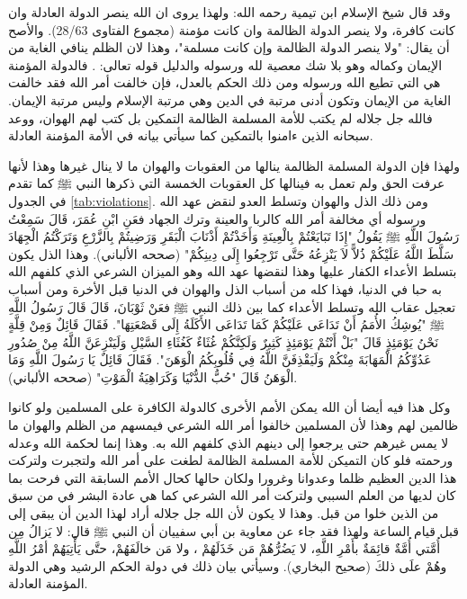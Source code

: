 وقد قال شيخ الإسلام ابن تيمية رحمه الله: ولهذا يروى ان الله ينصر الدولة العادلة وان كانت كافرة، ولا ينصر الدولة الظالمة وان كانت مؤمنة {\footnotesize (مجموع الفتاوى 28/63)}. والأصح أن يقال: "ولا ينصر الدولة الظالمة وإن كانت مسلمة"، وهذا لان الظلم ينافي الغاية من الإيمان وكماله وهو بلا شك معصية لله ورسوله والدليل قوله تعالى: \quranayah*[49][14]{\footnotesize \surahname*[49]}. فالدولة المؤمنة هي التي تطيع الله ورسوله ومن ذلك الحكم بالعدل، فإن خالفت أمر الله فقد خالفت الغاية من الإيمان وتكون أدنى مرتبة في الدين وهي مرتبة الإسلام وليس مرتبة الإيمان. فالله جل جلاله لم يكتب للأمة المسلمة الظالمة التمكين  بل كتب لهم الهوان، ووعد سبحانه الذين ءامنوا بالتمكين كما سيأتي بيانه في الأمة المؤمنة العادلة.

ولهذا فإن الدولة المسلمة الظالمة ينالها من العقوبات والهوان ما لا ينال غيرها وهذا لأنها عرفت الحق ولم تعمل به فينالها كل العقوبات الخمسة التي ذكرها النبي ﷺ كما تقدم في الجدول \ref{tab:violations}. ومن ذلك الذل والهوان وتسلط العدو لنقض عهد الله ورسوله أي مخالفة أمر الله كالربا والعينة وترك الجهاد فعَنِ ابْنِ عُمَرَ، قَالَ سَمِعْتُ رَسُولَ اللَّهِ ﷺ يَقُولُ "إِذَا تَبَايَعْتُمْ بِالْعِينَةِ وَأَخَذْتُمْ أَذْنَابَ الْبَقَرِ وَرَضِيتُمْ بِالزَّرْعِ وَتَرَكْتُمُ الْجِهَادَ سَلَّطَ اللَّهُ عَلَيْكُمْ ذُلاًّ لاَ يَنْزِعُهُ حَتَّى تَرْجِعُوا إِلَى دِينِكُمْ" {\footnotesize (صححه الألباني)}. وهذا الذل يكون بتسلط الأعداء الكفار عليها وهذا لنقضها عهد الله وهو الميزان الشرعي الذي كلفهم الله به حبا في الدنيا، فهذا كله من أسباب الذل والهوان في الدنيا قبل الأخرة ومن أسباب تعجيل عقاب الله وتسلط الأعداء  كما بين ذلك النبي ﷺ فعَنْ ثَوْبَانَ، قَالَ قَالَ رَسُولُ اللَّهِ ﷺ "يُوشِكُ الأُمَمُ أَنْ تَدَاعَى عَلَيْكُمْ كَمَا تَدَاعَى الأَكَلَةُ إِلَى قَصْعَتِهَا". فَقَالَ قَائِلٌ وَمِنْ قِلَّةٍ نَحْنُ يَوْمَئِذٍ قَالَ "بَلْ أَنْتُمْ يَوْمَئِذٍ كَثِيرٌ وَلَكِنَّكُمْ غُثَاءٌ كَغُثَاءِ السَّيْلِ وَلَيَنْزِعَنَّ اللَّهُ مِنْ صُدُورِ عَدُوِّكُمُ الْمَهَابَةَ مِنْكُمْ وَلَيَقْذِفَنَّ اللَّهُ فِي قُلُوبِكُمُ الْوَهَنَ". فَقَالَ قَائِلٌ يَا رَسُولَ اللَّهِ وَمَا الْوَهَنُ قَالَ "حُبُّ الدُّنْيَا وَكَرَاهِيَةُ الْمَوْتِ" {\footnotesize (صححه الألباني)}. 

وكل هذا فيه أيضا أن الله يمكن الأمم الأخرى كالدولة الكافرة على المسلمين ولو كانوا ظالمين لهم وهذا لأن المسلمين خالفوا أمر الله الشرعي فيمسهم من الظلم والهوان ما لا يمس غيرهم حتى يرجعوا إلى دينهم الذي كلفهم الله به. وهذا إنما لحكمة الله وعدله ورحمته فلو كان التميكن للأمة المسلمة الظالمة لطغت على أمر الله ولتجبرت ولتركت هذا الدين العظيم ظلما وعدوانا وغرورا ولكان حالها كحال الأمم السابقة التي فرحت بما كان لديها من العلم السببي  ولتركت أمر الله الشرعي كما هي عادة البشر في من سبق من الذين خلوا من قبل. وهذا لا يكون لأن الله جل جلاله أراد لهذا الدين أن يبقى إلى قبل قيام الساعة ولهذا فقد جاء عن معاوية بن أبي سفييان أن النبي ﷺ قال: لا يَزالُ مِن أُمَّتي أُمَّةٌ قائِمَةٌ بأَمْرِ اللَّهِ، لا يَضُرُّهُمْ مَن خَذَلَهُمْ ، ولا مَن خالَفَهُمْ، حتَّى يَأْتِيَهُمْ أمْرُ اللَّهِ وهُمْ علَى ذلكَ {\footnotesize (صحيح البخاري)}. وسيأتي بيان ذلك في دولة الحكم الرشيد وهي الدولة المؤمنة العادلة.


